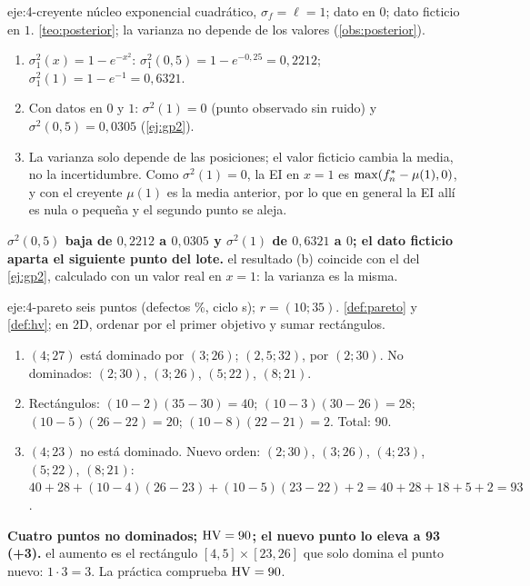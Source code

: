 \begin{solucion}{eje:4-creyente}
\datos núcleo exponencial cuadrático, $\sigma_f=\ell=1$; dato en $0$; dato ficticio en $1$.
\planteamiento \cref{teo:posterior}; la varianza no depende de los valores (\cref{obs:posterior}).
\pasos
\begin{enumerate}[label=(\alph*)]
  \item $\sigma_1^2(x)=1-e^{-x^2}$: $\sigma_1^2(0{,}5)=1-e^{-0{,}25}=0{,}2212$; $\sigma_1^2(1)=1-e^{-1}=0{,}6321$.
  \item Con datos en $0$ y $1$: $\sigma^2(1)=0$ (punto observado sin ruido) y $\sigma^2(0{,}5)=0{,}0305$ (\cref{ej:gp2}).
  \item La varianza solo depende de las posiciones; el valor ficticio cambia la media, no la incertidumbre. Como $\sigma^2(1)=0$, la EI en $x=1$ es $\max(f^{*}_{n}-\mu(1),0)$, y con el creyente $\mu(1)$ es la media anterior, por lo que en general la EI allí es nula o pequeña y el segundo punto se aleja.
\end{enumerate}
\resultado \textbf{$\sigma^2(0{,}5)$ baja de $0{,}2212$ a $0{,}0305$ y $\sigma^2(1)$ de $0{,}6321$ a $0$; el dato ficticio aparta el siguiente punto del lote.}
\comprobacion el resultado (b) coincide con el del \cref{ej:gp2}, calculado con un valor real en $x=1$: la varianza es la misma.
\end{solucion}

\begin{solucion}{eje:4-pareto}
\datos seis puntos (defectos \%, ciclo s); $r=(10;35)$.
\planteamiento \cref{def:pareto} y \cref{def:hv}; en 2D, ordenar por el primer objetivo y sumar rectángulos.
\pasos
\begin{enumerate}[label=\arabic*.]
  \item $(4;27)$ está dominado por $(3;26)$; $(2{,}5;32)$, por $(2;30)$. No dominados: $(2;30)$, $(3;26)$, $(5;22)$, $(8;21)$.
  \item Rectángulos: $(10-2)(35-30)=40$; $(10-3)(30-26)=28$; $(10-5)(26-22)=20$; $(10-8)(22-21)=2$. Total: 90.
  \item $(4;23)$ no está dominado. Nuevo orden: $(2;30)$, $(3;26)$, $(4;23)$, $(5;22)$, $(8;21)$: $40+28+(10-4)(26-23)+(10-5)(23-22)+2=40+28+18+5+2=93$.
\end{enumerate}
\resultado \textbf{Cuatro puntos no dominados; $\operatorname{HV}=90$; el nuevo punto lo eleva a 93 (+3).}
\comprobacion el aumento es el rectángulo $[4,5]\times[23,26]$ que solo domina el punto nuevo: $1\cdot3=3$. La práctica comprueba $\operatorname{HV}=90$.
\end{solucion}

